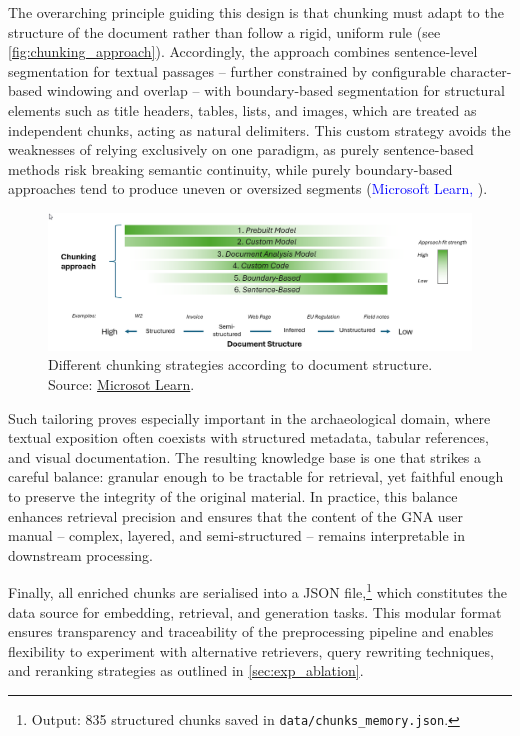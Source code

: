 \begin{spacing}{1.5}
The overarching principle guiding this design is that chunking must adapt to the structure of the document rather than follow a rigid, uniform rule (see \autoref{fig:chunking_approach}). Accordingly, the approach combines sentence-level segmentation for textual passages -- further constrained by configurable character-based windowing and overlap -- with boundary-based segmentation for structural elements such as title headers, tables, lists, and images, which are treated as independent chunks, acting as natural delimiters. This custom strategy avoids the weaknesses of relying exclusively on one paradigm, as purely sentence-based methods risk breaking semantic continuity, while purely boundary-based approaches tend to produce uneven or oversized segments (\textcolor{blue}{Microsoft Learn,} \citeyear{noauthor_develop_2025}).

\vspace{0.8em}
\begin{figure}[H]
  \centering
  \includegraphics[width=\textwidth]{images/chunking-approaches-by-document-structure.png} 
  \caption{Different chunking strategies according to document structure.\\
  \footnotesize{Source: \href{https://web.archive.org/web/20250825093743/https://learn.microsoft.com/en-us/azure/architecture/ai-ml/guide/rag/rag-chunking-phase}{Microsot Learn}}.}
  \label{fig:chunking_approach}
\end{figure}

Such tailoring proves especially important in the archaeological domain, where textual exposition often coexists with structured metadata, tabular references, and visual documentation. The resulting knowledge base is one that strikes a careful balance: granular enough to be tractable for retrieval, yet faithful enough to preserve the integrity of the original material. In practice, this balance enhances retrieval precision and ensures that the content of the GNA user manual -- complex, layered, and semi-structured -- remains interpretable in downstream processing.

Finally, all enriched chunks are serialised into a JSON file,\footnote{Output: 835 structured chunks saved in \texttt{data/chunks\_memory.json}.} which constitutes the data source for embedding, retrieval, and generation tasks. This modular format ensures transparency and traceability of the preprocessing pipeline and enables flexibility to experiment with alternative retrievers, query rewriting techniques, and reranking strategies as outlined in \autoref{sec:exp_ablation}.


\end{spacing}
